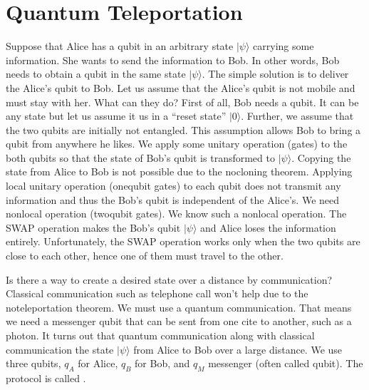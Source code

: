 \documentclass[letterpaper,10pt,english]{jupyterBook}
\begin{document}
\section{Quantum Teleportation}
\label{\detokenize{algorithms/teleportation:quantum-teleportation}}\label{\detokenize{algorithms/teleportation:sec-teleportation}}\label{\detokenize{algorithms/teleportation::doc}}
\sphinxAtStartPar
Suppose that Alice has a qubit in an arbitrary state \(|\psi\rangle\) carrying some information.  She wants to send the information to Bob. In other words, Bob needs to obtain a qubit in the same state \(|\psi\rangle\).  The simple solution is to deliver the Alice’s qubit to Bob.  Let us assume that the Alice’s qubit is not mobile and must stay with her.  What can they do?  First of all, Bob needs a qubit.  It can be any state but let us assume it us in a “reset state” \(|0\rangle\).  Further, we assume that the two qubits are initially not entangled. This assumption allows Bob to bring a qubit from anywhere he likes.  We apply some unitary operation (gates) to the both qubits so that the state of Bob’s qubit  is transformed to \(|\psi\rangle\).  Copying the state from Alice to Bob is not possible due to the no\sphinxhyphen{}cloning theorem.  Applying local unitary operation (one\sphinxhyphen{}qubit gates) to each qubit does not transmit any information and thus the Bob’s qubit is independent of the Alice’s. We need non\sphinxhyphen{}local operation (two\sphinxhyphen{}qubit gates).   We know such a non\sphinxhyphen{}local operation.  The SWAP operation makes the Bob’s qubit \(|\psi\rangle\) and Alice loses the information entirely.  Unfortunately, the SWAP operation works only when the two qubits are close to each other, hence one of them must travel to the other.

\sphinxAtStartPar
Is there a way to create a desired state over a distance by communication?  Classical communication such as telephone call won’t help due to the no\sphinxhyphen{}teleportation theorem. We must use a quantum communication.  That means we need a messenger qubit that can be sent from one cite to another, such as a photon. It turns out that quantum communication along with classical communication  the state \(|\psi\rangle\) from Alice to Bob over a large distance.  We use three qubits, \(q_A\) for Alice, \(q_B\) for Bob, and \(q_M\) messenger (often called  qubit).  The protocol is called .
\end{document}
